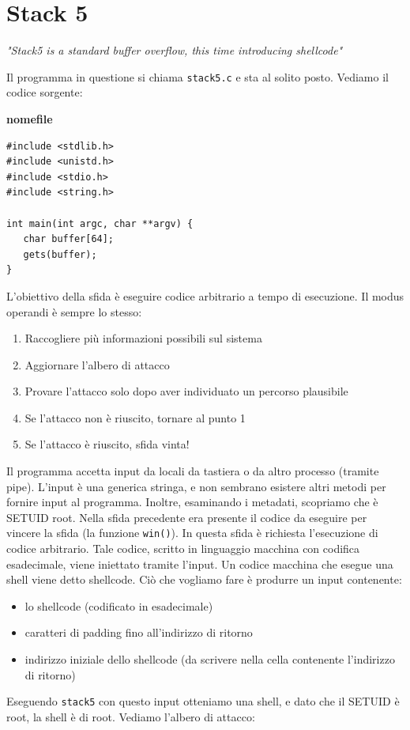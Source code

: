\section{Stack 5}
\begin{center}
\textit{"Stack5 is a standard buffer overflow, this
time introducing shellcode"}
\end{center}
Il programma in questione si chiama \texttt{stack5.c} e sta al solito posto. Vediamo il codice sorgente:

\begin{mdframed}[backgroundcolor=white!20,shadow=false]
\textbf{nomefile}
\begin{verbatim}
#include <stdlib.h>
#include <unistd.h>
#include <stdio.h>
#include <string.h>

int main(int argc, char **argv) {
   char buffer[64];
   gets(buffer);
}
\end{verbatim}
\end{mdframed}

L'obiettivo della sfida è eseguire codice arbitrario a tempo di esecuzione. Il modus operandi è sempre lo stesso:
\begin{enumerate}
    \item Raccogliere più informazioni possibili sul sistema
    \item Aggiornare l'albero di attacco
    \item Provare l'attacco solo dopo aver individuato un
percorso plausibile
    \item Se l'attacco non è riuscito, tornare al punto 1
    \item Se l'attacco è riuscito, sfida vinta! 
\end{enumerate} 
Il programma accetta input da locali da tastiera o da altro processo (tramite pipe). L'input è una generica stringa, e non sembrano esistere altri metodi per fornire input al programma. Inoltre, esaminando i metadati, scopriamo che è SETUID root. Nella sfida precedente era presente il codice da eseguire per vincere la sfida (la funzione \texttt{win()}). In questa sfida è richiesta l'esecuzione di codice arbitrario. Tale codice, scritto in linguaggio macchina con codifica esadecimale, viene iniettato tramite l'input. Un codice macchina che esegue una shell viene detto shellcode. Ciò che vogliamo fare è produrre un input contenente:
\begin{itemize}
    \item lo shellcode (codificato in esadecimale)
    \item caratteri di padding fino all'indirizzo di ritorno
    \item indirizzo iniziale dello shellcode (da scrivere nella cella contenente l'indirizzo di ritorno)
\end{itemize}
Eseguendo \texttt{stack5} con questo input otteniamo una shell, e dato che il SETUID è root, la shell è di root. Vediamo l'albero di attacco:

